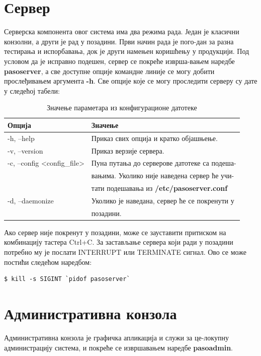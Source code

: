 \documentclass[a4paper, 12pt, diplomski]{etfcyr}
\begin{document}
		\section{Сервер}
			\begin{justify}
				Серверска компонента овог система има два режима рада. Један је класични конзолни, а други је рад у позадини. Први начин рада је пого-дан за разна тестирања и испорбавања, док је други намењен коришћењу у продукцији. Под условом да је исправно подешен, сервер се покреће изврша-вањем наредбе \textbf{pasoserver}, а све доступне опције командне линије се могу добити прослеђивањем аргумента \textbf{-h}. Све опције које се могу проследити серверу су дате у следећој табели:
				\begin{table}[H]
					\begin{tabular}{l l}
						Опција & Значење \\
						\hline
						-h, --help & Приказ свих опција и кратко објашњење. \\
						-v, --version & Приказ верзије сервера. \\
						-c, --config <config\_file> & Пуна путања до серверове датотеке са подеша- \\
						&вањима. Уколико није наведена сервер ће учи- \\
						&тати подешавања из \textbf{/etc/pasoserver.conf} \\
						-d, --daemonize & Уколико је наведана, сервер ће се покренути у \\
						&позадини. \\
						\hline
					\end{tabular}
					\caption{Значење параметара из конфигурационе датотеке}
					\label{table:server_cmd_line_args}
				\end{table}
				Ако сервер није покренут у позадини, може се зауставити притиском на комбинацију тастера Ctrl+C. За застављање сервера који ради у позадини потребно му је послати INTERRUPT или TERMINATE сигнал. Ово се може постићи следећом наредбом:
				\begin{footnotesize}
					\begin{verbatim}
$ kill -s SIGINT `pidof pasoserver`
					\end{verbatim}
				\end{footnotesize}
			\end{justify}
			
		\section{Административна конзола}
			\begin{justify}
				Административна конзола је графичка апликација и служи за це-локупну администрацију система, и покреће се извршавањем наредбе \textbf{pasoadmin}.
			\end{justify}
\end{document}
